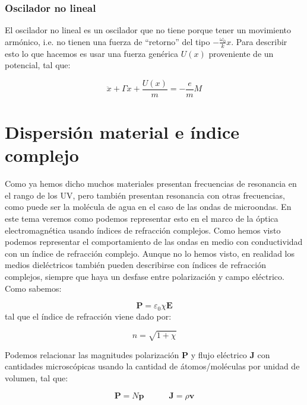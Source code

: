 \documentclass[12pt,a4paper]{article}
\newcommand{\tquad}{\quad \quad \quad}
\newcommand{\En}{\mathbf{E}}
\newcommand{\Jn}{\mathbf{J}}
\newcommand{\vn}{\mathbf{v}}
\newcommand{\Pn}{\mathbf{P}}
\newcommand{\pn}{\mathbf{p}}
\numberwithin{equation}{section}
\numberwithin{figure}{section}
\begin{document}
\subsubsection{Oscilador no lineal}

El oscilador no lineal es un oscilador que no tiene porque tener un movimiento armónico, i.e. no tienen una fuerza de ``retorno'' del tipo $-\frac{\omega_0}{k}x$. Para describir esto lo que hacemos es usar una fuerza genérica $U(x)$ proveniente de un potencial, tal que:

\begin{equation}
\ddot{x} + \Gamma \dot{x} + \dfrac{U(x)}{m} = - \dfrac{e}{m}M 
\end{equation}


 \newpage

\section{Dispersión material e índice complejo}

Como ya hemos dicho muchos materiales presentan frecuencias de resonancia en el rango de los UV, pero también presentan resonancia con otras frecuencias, como puede ser la molécula de agua en el caso de las ondas de microondas. En este tema veremos como podemos representar esto en el marco de la óptica electromagnética usando índices de refracción complejos. Como hemos visto podemos representar el comportamiento de las ondas en medio con conductividad con un índice de refracción complejo. Aunque no lo hemos visto, en realidad los medios dieléctricos también pueden describirse con índices de refracción complejos, siempre que haya un desfase entre polarización y campo eléctrico. Como sabemos:

\begin{equation}
\Pn = \varepsilon_0 \chi \En \label{Ec:8.0.0.01}
\end{equation}
tal que el índice de refracción viene dado por:

\begin{equation}
n = \sqrt{1+\chi}
\end{equation}

Podemos relacionar las magnitudes polarización $\Pn$ y flujo eléctrico $\Jn$ con cantidades microscópicas usando la cantidad de átomos/moléculas por unidad de volumen, tal que:

\begin{equation}
\Pn = N \pn \tquad \Jn = \rho \vn \label{Ec:8.0.0.04}
\end{equation}
\end{document}
